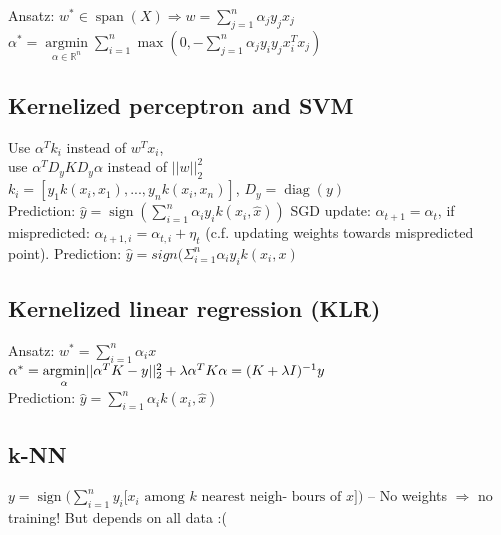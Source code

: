 Ansatz: $w^* \in \operatorname{span}(X) \Rightarrow w = \sum_{j=1}^n \alpha_j y_j x_j$\\
$\alpha^*= \underset{\alpha \in \mathbb{R}^n}{\operatorname{argmin}} \sum_{i=1}^n \operatorname{max}(0, - \sum_{j=1}^n \alpha_j y_i y_j x_i^T x_j)$

\subsection*{Kernelized perceptron and SVM}
Use $\alpha^T k_i$ instead of $w^T x_i$,\\
use $\alpha^T D_y K D_y \alpha$ instead of $||w||_2^2$\\ 
$k_i=[y_1 k(x_i,x_1), ..., y_n k(x_i,x_n)]$, $D_y = \operatorname{diag}(y)$\\
Prediction: $\hat{y} = \operatorname{sign}(\sum_{i=1}^n \alpha_i y_i k(x_i, \hat{x}))$
SGD update: $\alpha_{t+1} = \alpha_t$, if mispredicted: $\alpha_{t+1,i} = \alpha_{t,i} + \eta_t$ (c.f. updating weights towards mispredicted point). Prediction: $\hat{y} = sign (\Sigma_{i=1}^n \alpha_i y_i k(x_i, x)$

\subsection*{Kernelized linear regression (KLR)}
Ansatz: $w^*=\sum_{i = 1}^n \alpha_i x$\\
$\alpha^*= \underset{\alpha}{\operatorname{argmin}} ||\alpha^T K - y||_2^2 + \lambda \alpha^T K \alpha \\= (K+\lambda I)^{-1} y$\\
Prediction: $\hat{y} = \sum \limits_{i=1}^n \alpha_i k(x_i,\hat{x})$

\subsection*{k-NN}
$y = \operatorname{sign} \big( \sum_{i=1}^n y_i [x_i \text{ among } k \text{ nearest neigh-}$ $\text{bours of } x] \big)$ --
No weights $\Rightarrow$ no training! But depends on all data :(